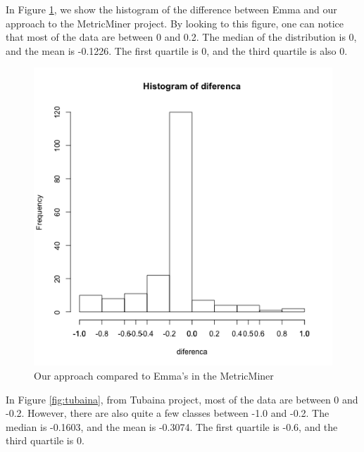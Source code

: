 \documentclass{sig-alternate}
\begin{document}
In Figure \ref{fig:metricminer}, we show the histogram of the difference between Emma and our approach to
the MetricMiner project. By looking to this figure, one can notice that most of the data are between 0 and 0.2. 
The median of the distribution is 0, and the mean is -0.1226. The first quartile is 0, and the
third quartile is also 0.

\begin{figure}[h!H]
  \centering
  \includegraphics[scale=0.28]{../stats/metricminer-histograma-gelato.png}
  \caption{Our approach compared to Emma's in the MetricMiner}
  \label{fig:metricminer}
\end{figure}

In Figure \ref{fig:tubaina}, from Tubaina project, most of the data are between
0 and -0.2. However, there are also quite a few classes between -1.0 and -0.2. 
The median is -0.1603, and the mean is -0.3074. The first quartile is
-0.6, and the third quartile is 0.
\end{document}
